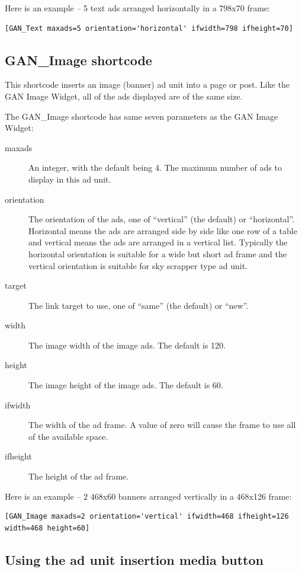 \documentclass[letterpaper]{article}
\begin{document}
Here is an example -- 5 text ads arranged horizontally in a 798x70 frame:
\begin{verbatim}
[GAN_Text maxads=5 orientation='horizontal' ifwidth=798 ifheight=70]
\end{verbatim}

\subsection{GAN\_Image shortcode}

This shortcode inserts an image (banner) ad unit into a page or post.
Like the GAN Image Widget, all of the ads displayed are of the same
size. 

The GAN\_Image shortcode has same seven parameters as the GAN Image
Widget:
\begin{description}
  \item[maxads] An integer, with the default being 4.
The maximum number of ads to display in this ad unit.
  \item[orientation] The orientation of the ads, one of
``vertical'' (the default) or ``horizontal''. Horizontal means the ads are
arranged side by side like one row of a table and      vertical means
the ads are arranged in a vertical list. Typically the horizontal
orientation is suitable for a wide but short ad frame and the vertical
orientation is suitable for sky scrapper type ad unit.
  \item[target] The link target to use, one of ``same'' (the
default) or ``new''.
  \item[width] The image width of the image ads. The
default is 120.
  \item[height] The image height of the image ads. The
default is 60.
  \item[ifwidth] The width of the ad frame. A value
of zero will cause the frame to use all of the available space.
  \item[ifheight] The height of the ad frame.
\end{description}

Here is an example -- 2 468x60 banners arranged vertically in a 468x126 frame:
\begin{verbatim}
[GAN_Image maxads=2 orientation='vertical' ifwidth=468 ifheight=126 width=468 height=60]
\end{verbatim}

\subsection{Using the ad unit insertion media button}
\end{document}
